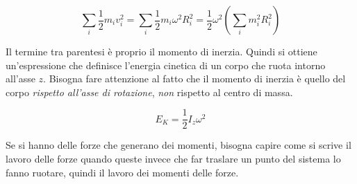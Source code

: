 \[
	\sum_i \frac{1}{2} m_i v_i^2 = \sum_i \frac{1}{2} m_i\omega^2 R_i^2  = \frac{1}{2} \omega^2 \left( \sum_i m_i^2 R_i^2 \right)
\]

Il termine tra parentesi è proprio il momento di inerzia. Quindi si ottiene un'espressione che definisce l'energia cinetica di un corpo che ruota intorno all'asse $z$. Bisogna fare attenzione al fatto che il momento di inerzia è quello del corpo \emph{rispetto all'asse di rotazione}, \emph{non} rispetto al centro di massa.

\[
	E_K=\frac{1}{2} I_z\omega^2
\]

Se si hanno delle forze che generano dei momenti, bisogna capire come si scrive il lavoro delle forze quando queste invece che far traslare un punto del sistema lo fanno ruotare, quindi il lavoro dei momenti delle forze.


